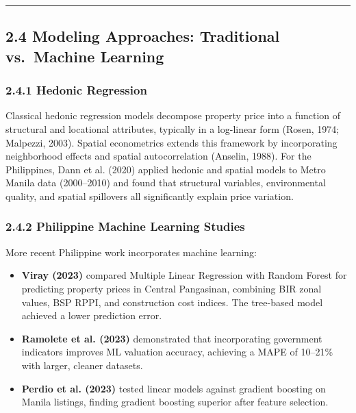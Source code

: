 \begin{center}\rule{0.5\linewidth}{0.5pt}\end{center}

\subsection{\texorpdfstring{\textbf{2.4 Modeling Approaches: Traditional vs.~Machine Learning}}{2.4 Modeling Approaches: Traditional vs.~Machine Learning}}\label{modeling-approaches-traditional-vs.-machine-learning}

\subsubsection{\texorpdfstring{\textbf{2.4.1 Hedonic Regression}}{2.4.1 Hedonic Regression}}\label{hedonic-regression}

Classical hedonic regression models decompose property price into a function of structural and locational attributes, typically in a log-linear form (Rosen, 1974; Malpezzi, 2003). Spatial econometrics extends this framework by incorporating neighborhood effects and spatial autocorrelation (Anselin, 1988). For the Philippines, Dann et al. (2020) applied hedonic and spatial models to Metro Manila data (2000--2010) and found that structural variables, environmental quality, and spatial spillovers all significantly explain price variation.

\subsubsection{\texorpdfstring{\textbf{2.4.2 Philippine Machine Learning Studies}}{2.4.2 Philippine Machine Learning Studies}}\label{philippine-machine-learning-studies}

More recent Philippine work incorporates machine learning:

\begin{itemize}
\item \textbf{Viray (2023)} compared Multiple Linear Regression with Random Forest for predicting property prices in Central Pangasinan, combining BIR zonal values, BSP RPPI, and construction cost indices. The tree-based model achieved a lower prediction error.
\item \textbf{Ramolete et al. (2023)} demonstrated that incorporating government indicators improves ML valuation accuracy, achieving a MAPE of 10--21\% with larger, cleaner datasets.
\item \textbf{Perdio et al. (2023)} tested linear models against gradient boosting on Manila listings, finding gradient boosting superior after feature selection.
\end{itemize}

